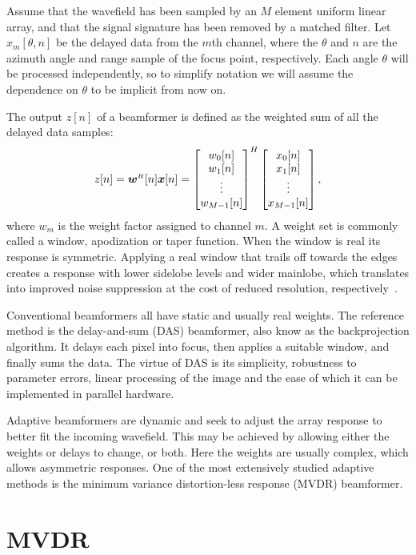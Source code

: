 Assume that the wavefield has been sampled by an $M$ element uniform linear array, and that the signal signature has been removed by a matched filter. Let $x_m[\theta,n]$ be the delayed data from the $m$th channel, where the $\theta$ and $n$ are the azimuth angle and range sample of the focus point, respectively. Each angle $\theta$ will be processed independently, so to simplify notation we will assume the dependence on $\theta$ to be implicit from now on. 

The output $z[n]$ of a beamformer is defined as the weighted sum of all the delayed data samples:
%
\begin{align}
z[n] = \w\H[n]\x[n] = \bmat{w_0[n]\\w_1[n]\\\vdots\\w_{M-1}[n]}^H \bmat{x_0[n]\\x_1[n]\\\vdots\\x_{M-1}[n]},\label{III_eq:beamformer_output}
\end{align}
%
where $w_m$ is the weight factor assigned to channel $m$. A weight set is commonly called a window, apodization or taper function. When the window is real its response is symmetric. Applying a real window that trails off towards the edges creates a response with lower sidelobe levels and wider mainlobe, which translates into improved noise suppression at the cost of reduced resolution, respectively~\cite{Harris1978}.

Conventional beamformers all have static and usually real weights. The reference method is the delay-and-sum (DAS) beamformer, also know as the backprojection algorithm. It delays each pixel into focus, then applies a suitable window, and finally sums the data. The virtue of DAS is its simplicity, robustness to parameter errors, linear processing of the image and the ease of which it can be implemented in parallel hardware.

Adaptive beamformers are dynamic and seek to adjust the array response to better fit the incoming wavefield. This may be achieved by allowing either the weights or delays to change, or both. Here the weights are usually complex, which allows asymmetric responses. One of the most extensively studied adaptive methods is the minimum variance distortion-less response (MVDR) beamformer.

\section{MVDR}\label{III_sec:mvdr}

